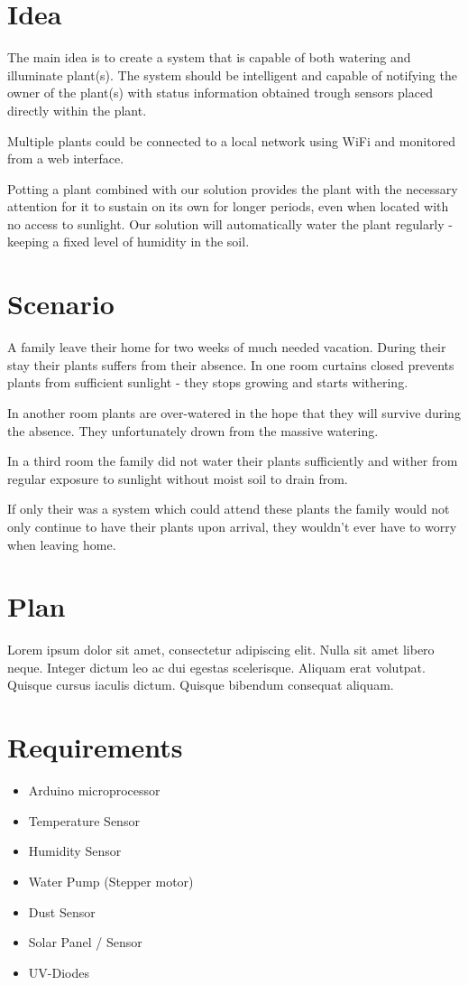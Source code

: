 \documentclass{ubicomp2012}
\begin{document}
\section{Idea}
The main idea is to create a system that is capable of both watering and illuminate plant(s). The system should be intelligent and capable of notifying the owner of the plant(s) with status information obtained trough sensors placed directly within the plant.

Multiple plants could be connected to a local network using WiFi and monitored from a web interface.

Potting a plant combined with our solution provides the plant with the necessary attention for it to sustain on its own for longer periods, even when located with no access to sunlight. Our solution will automatically water the plant regularly - keeping a fixed level of humidity in the soil.

\section{Scenario}
A family leave their home for two weeks of much needed vacation. During their stay their plants suffers from their absence. In one room curtains closed prevents plants from sufficient sunlight - they stops growing and starts withering.

In another room plants are over-watered in the hope that they will survive during the absence. They unfortunately drown from the massive watering.

In a third room the family did not water their plants sufficiently and wither from regular exposure to sunlight without moist soil to drain from.

If only their was a system which could attend these plants the family would not only continue to have their plants upon arrival, they wouldn't ever have to worry when leaving home.

\section{Plan}
Lorem ipsum dolor sit amet, consectetur adipiscing elit. Nulla sit amet libero neque. Integer dictum leo ac dui egestas scelerisque. Aliquam erat volutpat. Quisque cursus iaculis dictum. Quisque bibendum consequat aliquam.

\section{Requirements}
\begin{itemize}
\item Arduino microprocessor
\item Temperature Sensor
\item Humidity Sensor
\item Water Pump (Stepper motor)
\item Dust Sensor
\item Solar Panel / Sensor
\item UV-Diodes 
\end{itemize}
\end{document}
